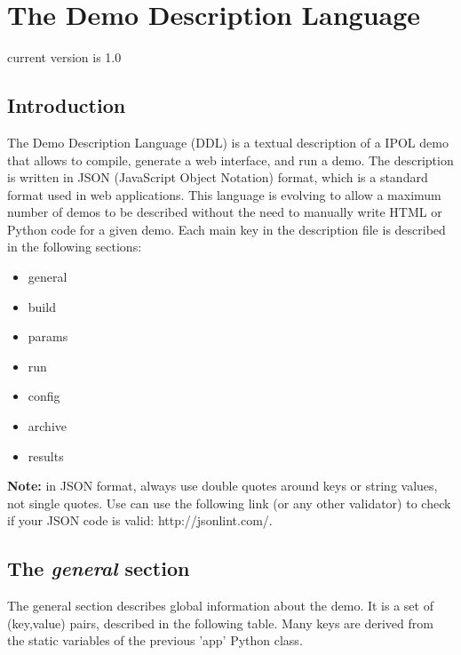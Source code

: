 \section{The Demo Description Language}

current version is 1.0

\subsection{Introduction}
The Demo Description Language (DDL) is a textual description of a IPOL demo that 
allows to compile, generate a web interface, and run a demo. The description is 
written in JSON (JavaScript Object Notation) format, which is a standard format 
used in web applications. This language is evolving to allow a maximum number 
of demos to be described without the need to manually write HTML or Python code 
for a given demo. Each main key in the description file is described in the 
following sections:
\begin{itemize}
  \item general
  \item build
  \item params
  \item run
  \item config
  \item archive
  \item results
\end{itemize}



{\bf Note:} in JSON format, always use double quotes around keys or string 
values, not single quotes. Use can use the following link (or any other validator)
to check if your JSON code is valid: http://jsonlint.com/.



\subsection{The \emph{general} section}
The general section describes global information about the demo. It is a set of 
(key,value) pairs, described in the following table. Many keys are derived from 
the static variables of the previous 'app' Python class.

